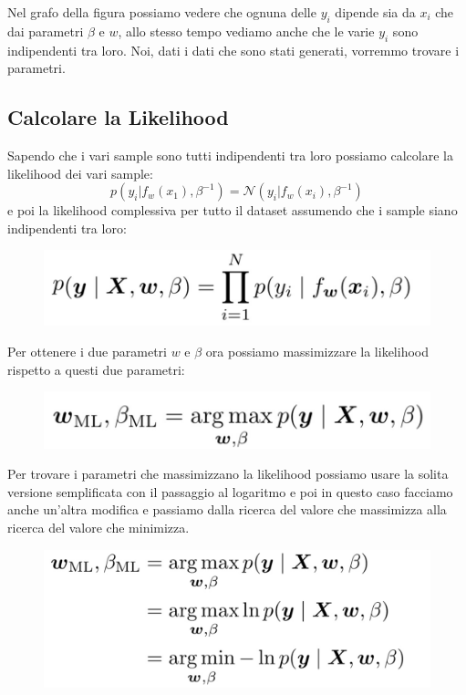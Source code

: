 \documentclass[14pt]{extreport}
\begin{document}
Nel grafo della figura possiamo vedere che ognuna delle $y_i$ dipende sia da $x_i$ che dai parametri $\beta$ e $w$, allo stesso tempo vediamo anche
che le varie $y_i$ sono indipendenti tra loro. Noi, dati i dati che sono stati generati, vorremmo trovare i parametri.

\subsection{Calcolare la Likelihood}

Sapendo che i vari sample sono tutti indipendenti tra loro possiamo calcolare la likelihood dei vari sample: $$p(y_i | f_w(x_1),
\beta^{-1})=\mathcal{N}(y_i|f_w(x_i),\beta^{-1})$$ e poi la likelihood complessiva per tutto il dataset assumendo che i sample siano indipendenti tra
loro:

\begin{figure}[H]
\centering
\includegraphics[width=0.5\linewidth]{105.jpeg}
\end{figure}

Per ottenere i due parametri $w$ e $\beta$ ora possiamo massimizzare la likelihood rispetto a questi due parametri:

\begin{figure}[H]
\centering
\includegraphics[width=0.5\linewidth]{106.jpeg}
\end{figure}

Per trovare i parametri che massimizzano la likelihood possiamo usare la solita versione semplificata con il passaggio al logaritmo e poi in questo
caso facciamo anche un'altra modifica e passiamo dalla ricerca del valore che massimizza alla ricerca del valore che minimizza.

\begin{figure}[H]
\centering
\includegraphics[width=0.5\linewidth]{107.jpeg}
\end{figure}
\end{document}

